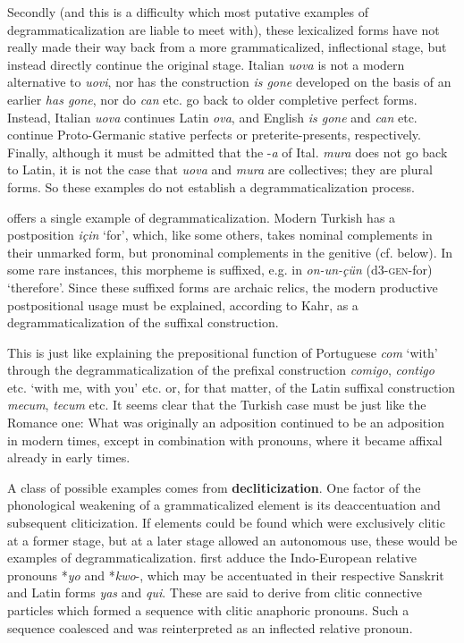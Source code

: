 Secondly (and this is a difficulty which most putative examples of degrammaticalization are liable to meet with), these lexicalized forms have not really made their way back from a more grammaticalized, inflectional stage, but instead directly continue the original stage. Italian \textit{uova} is not a modern alternative to \textit{uovi}, nor has the construction \textit{is gone} developed on the basis of an earlier \textit{has gone}, nor do \textit{can} etc. go back to older completive perfect forms. Instead, Italian \textit{uova} continues Latin \textit{ova}, and English \textit{is gone} and \textit{can} etc. continue Proto-Germanic stative perfects or preterite-presents, respectively. Finally, although it must be admitted that the -\textit{a} of Ital. \textit{mura} does not go back to Latin, it is not the case that \textit{uova} and \textit{mura} are collectives; they are plural forms. So these examples do not establish a degrammaticalization process.

\citet[122]{Kahr1976} offers a single example of degrammaticalization. Modern Turkish has a postposition \textit{için} ‘for’, which, like some others, takes nominal complements in their unmarked form, but pronominal complements in the genitive (cf. \pageref{abc}\chk%
below). In some rare instances, this morpheme is suffixed, e.g. in \textit{on-un-çün} (d3-\textsc{gen}-for) ‘therefore’. Since these suffixed forms are archaic relics, the modern productive postpositional usage must be explained, according to Kahr, as a degrammaticalization of the suffixal construction.

This is just like explaining the prepositional function of Portuguese \textit{com} ‘with’ through the degrammaticalization of the prefixal construction \textit{comigo}, \textit{contigo} etc. ‘with me, with you’ etc. or, for that matter, of the Latin suffixal construction \textit{mecum}, \textit{tecum} etc. It seems clear that the Turkish case must be just like the Romance one: What was originally an adposition continued to be an adposition in modern times, except in combination with pronouns, where it became affixal already in early times.

A class of possible examples comes from \textbf{decliticization}. One factor of the phonological weakening of a grammaticalized element is its deaccentuation and subsequent cliticization. If elements could be found which were exclusively clitic at a former stage, but at a later stage allowed an autonomous use, these would be examples of degrammaticalization. \citet[§~3]{JeffersEtAl1980} first adduce the Indo-European relative pronouns *\textit{yo} and *\textit{kwo}{}-, which may be accentuated in their respective Sanskrit and Latin forms \textit{yas} and \textit{qui}. These are said to derive from clitic connective particles which formed a sequence with clitic anaphoric pronouns. Such a sequence coalesced and was reinterpreted as an inflected relative pronoun.

